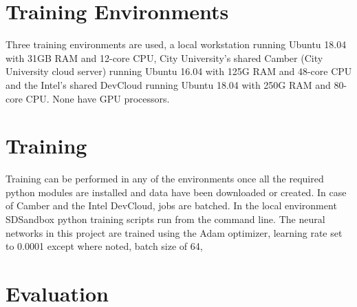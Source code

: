 \section{Training Environments}
Three training environments are used, a local workstation running Ubuntu 18.04 with 31GB RAM and 12-core CPU, City University's shared Camber (City University cloud server) running Ubuntu 16.04 with 125G RAM and 48-core CPU and the Intel's shared DevCloud running Ubuntu 18.04 with 250G RAM and 80-core CPU. None have GPU processors.



\section{Training}
Training can be performed in any of the environments once all the required python modules are installed and data have been downloaded or created. In case of Camber and the Intel DevCloud, jobs are batched. In the local environment SDSandbox python training scripts run from the command line.  
The neural networks in this project are trained using the Adam optimizer, learning rate set to 0.0001 except where noted, batch size of 64, 


\section{Evaluation}

